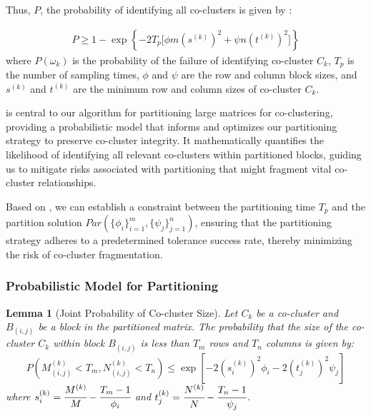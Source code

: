 \documentclass[journal]{IEEEtran}
\newtheorem{lemma}{Lemma}
\begin{document}
Thus, $P$, the probability of identifying all co-clusters is given by :

\begin{equation}
    \begin{split}
        P \ge 1 - \exp \left\{ -2 T_p \lbrack \phi m (s^{(k)})^2 + \psi n (t^{(k)})^2\rbrack  \right\} \label{eq:prob_of_identifying_all_co_clusters}
    \end{split}
\end{equation}
where $P(\omega_k)$ is the probability of the failure of identifying co-cluster $C_k$, $T_p$ is the number of sampling times, $\phi$ and $\psi$ are the row and column block sizes, and $s^{(k)}$ and $t^{(k)}$ are the minimum row and column sizes of co-cluster $C_k$.

 is central to our algorithm for partitioning large matrices for co-clustering, providing a probabilistic model that informs and optimizes our partitioning strategy to preserve co-cluster integrity. It mathematically quantifies the likelihood of identifying all relevant co-clusters within partitioned blocks, guiding us to mitigate risks associated with partitioning that might fragment vital co-cluster relationships.

Based on , we can establish a constraint between the partitioning time $T_p$ and the partition solution $Par(\{\phi_i\}_{i=1}^m, \{\psi_j\}_{j=1}^n)$, ensuring that the partitioning strategy adheres to a predetermined tolerance success rate, thereby minimizing the risk of co-cluster fragmentation.

\subsubsection{Probabilistic Model for Partitioning}
\label{subsec:probabilistic_model}
\begin{lemma}[Joint Probability of Co-cluster Size]
    \label{thm:joint_probability}
    Let $C_k$ be a co-cluster and $B_{(i,j)}$ be a block in the partitioned matrix. The probability that the size of the co-cluster $C_k$ within block $B_{(i,j)}$ is less than $T_m$ rows and $T_n$ columns is given by:
    \begin{equation}
        P(M_{(i,j)}^{(k)} < T_m, N_{(i,j)}^{(k)} < T_n) \leq \exp\left[-2 (s_i^{(k)})^2 \phi_i -2 (t_j^{(k)})^2 \psi_j\right]
    \end{equation}
    where $s_i^{(k)} = \cfrac{M^{(k)}}{M} - \cfrac{T_m-1}{\phi_i}$ and $t_j^{(k)} = \cfrac{N^{(k)}}{N} - \cfrac{T_n-1}{\psi_j}$.
\end{lemma}
\end{document}
